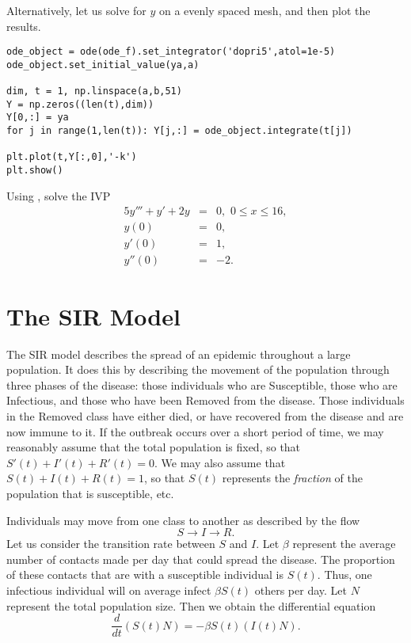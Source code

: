 Alternatively, let us solve for $y$ on a evenly spaced mesh, and then plot the results.
\begin{lstlisting}
ode_object = ode(ode_f).set_integrator('dopri5',atol=1e-5) 
ode_object.set_initial_value(ya,a) 

dim, t = 1, np.linspace(a,b,51)
Y = np.zeros((len(t),dim))
Y[0,:] = ya
for j in range(1,len(t)): Y[j,:] = ode_object.integrate(t[j])  

plt.plot(t,Y[:,0],'-k')
plt.show()
\end{lstlisting}


\begin{problem}
Using , solve the IVP
\begin{eqnarray*}
5y''' + y'+2y &=& 0, \,\, 0 \leq x \leq 16,\\
y(0) &=&0,\\
y'(0) &=& 1,\\
y''(0) &=& -2.
\end{eqnarray*}
\end{problem}




\section*{The SIR Model}
The SIR model describes the spread of an epidemic throughout a large population. It does this by describing the movement of the population through three phases of the disease: those individuals who are Susceptible, those who are Infectious, and those who have been Removed from the disease. Those individuals in the Removed class have either died, or have recovered from the disease and are now immune to it. If the outbreak occurs over a short period of time, we may reasonably assume that the total population is fixed, so that $S'(t) + I'(t) + R'(t) = 0$.  We may also assume that $S(t) + I(t) + R(t) = 1$, so that $S(t)$ represents the \textit{fraction} of the population that is susceptible, etc. 

Individuals may move from one class to another as described by the flow 
\[S \to I \to R.\] Let us consider the transition rate between $S$ and $I $. Let $\beta$ represent the average number of contacts made per day that could spread the disease. The proportion of these contacts that are with a susceptible individual is $S(t)$. Thus, one infectious individual will on average infect $\beta S(t)$ others per day. Let $N$ represent the total population size. Then we obtain the differential equation
 \[\frac{d}{dt}(S(t) N) = -\beta S(t) (I(t) N).\]
 
